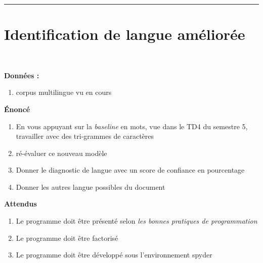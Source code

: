\newcommand{\numTD}{TD1}
\newcommand{\themeTD}{Analyse en caractères}
\newcommand{\file}{toto.tex}



\hrule

\noindent{}
\newline
\section{Identification de langue améliorée}
~\\
\vspace{-1cm}

\textbf{Données :}
\begin{enumerate}
  \item corpus multilingue vu en cours
\end{enumerate}

\textbf{Énoncé}

\begin{enumerate}
  \item En vous appuyant sur la \textit{baseline} en mots, vue dans le TD4 du semestre 5, travailler avec des tri-grammes de caractères
  \item ré-évaluer ce nouveau modèle
  \item Donner le diagnostic de langue avec un score de confiance en pourcentage
  \item Donner les autres langue possibles du document
\end{enumerate}

\textbf{Attendus}
\begin{enumerate}
  \item Le programme doit être présenté selon \textit{les bonnes pratiques de programmation}
  \item Le programme doit être factorisé
  \item Le programme doit être développé sous l'environnement spyder 
\end{enumerate}

